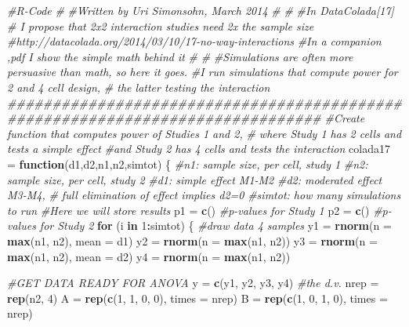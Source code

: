 \documentclass[
]{book}
\newenvironment{Shaded}{\begin{snugshade}}{\end{snugshade}}
\newcommand{\CommentTok}[1]{\textcolor[rgb]{0.56,0.35,0.01}{\textit{#1}}}
\newcommand{\ControlFlowTok}[1]{\textcolor[rgb]{0.13,0.29,0.53}{\textbf{#1}}}
\newcommand{\DataTypeTok}[1]{\textcolor[rgb]{0.13,0.29,0.53}{#1}}
\newcommand{\DecValTok}[1]{\textcolor[rgb]{0.00,0.00,0.81}{#1}}
\newcommand{\KeywordTok}[1]{\textcolor[rgb]{0.13,0.29,0.53}{\textbf{#1}}}
\newcommand{\NormalTok}[1]{#1}
\newcommand{\OperatorTok}[1]{\textcolor[rgb]{0.81,0.36,0.00}{\textbf{#1}}}
\newcommand{\StringTok}[1]{\textcolor[rgb]{0.31,0.60,0.02}{#1}}
\begin{document}
\begin{Shaded}
\begin{Highlighting}[]
\CommentTok{#R-Code}
\CommentTok{#}
\CommentTok{#Written by Uri Simonsohn, March 2014}
\CommentTok{#}
\CommentTok{#}
\CommentTok{#In DataColada[17] }
\CommentTok{# I propose that 2x2 interaction studies need 2x the sample size}
\CommentTok{#http://datacolada.org/2014/03/10/17-no-way-interactions}
\CommentTok{#In a companion ,pdf I show the simple math behind it}
\CommentTok{#}
\CommentTok{#}
\CommentTok{#Simulations are often more persuasive than math, so here it goes.}
\CommentTok{#I run simulations that compute power for 2 and 4 cell design, }
\CommentTok{# the latter testing the interaction}
\CommentTok{###############################################################################}
\CommentTok{#Create function that computes power of Studies 1 and 2, }
\CommentTok{# where Study 1  has 2 cells and tests a simple effect}
\CommentTok{#and Study 2 has 4 cells and tests the interaction}
\NormalTok{colada17 =}\StringTok{ }\ControlFlowTok{function}\NormalTok{(d1,d2,n1,n2,simtot)}
\NormalTok{  \{}
  \CommentTok{#n1: sample size, per cell, study 1}
  \CommentTok{#n2: sample size, per cell, study 2}
  \CommentTok{#d1: simple effect M1-M2}
  \CommentTok{#d2: moderated effect M3-M4, }
  \CommentTok{# full elimination of effect implies d2=0}
  \CommentTok{#simtot: how many simulations to run}
  \CommentTok{#Here we will store results}
\NormalTok{      p1 =}\StringTok{ }\KeywordTok{c}\NormalTok{()    }\CommentTok{#p-values for Study 1}
\NormalTok{      p2 =}\StringTok{ }\KeywordTok{c}\NormalTok{()    }\CommentTok{#p-values for Study 2}
  \ControlFlowTok{for}\NormalTok{ (i }\ControlFlowTok{in} \DecValTok{1}\OperatorTok{:}\NormalTok{simtot) \{}
    \CommentTok{#draw data 4 samples}
\NormalTok{    y1 =}\StringTok{ }\KeywordTok{rnorm}\NormalTok{(}\DataTypeTok{n =} \KeywordTok{max}\NormalTok{(n1, n2), }\DataTypeTok{mean =}\NormalTok{ d1)}
\NormalTok{    y2 =}\StringTok{ }\KeywordTok{rnorm}\NormalTok{(}\DataTypeTok{n =} \KeywordTok{max}\NormalTok{(n1, n2))}
\NormalTok{    y3 =}\StringTok{ }\KeywordTok{rnorm}\NormalTok{(}\DataTypeTok{n =} \KeywordTok{max}\NormalTok{(n1, n2), }\DataTypeTok{mean =}\NormalTok{ d2)}
\NormalTok{    y4 =}\StringTok{ }\KeywordTok{rnorm}\NormalTok{(}\DataTypeTok{n =} \KeywordTok{max}\NormalTok{(n1, n2))}
    
    \CommentTok{#GET DATA READY FOR ANOVA  }
\NormalTok{    y =}\StringTok{ }\KeywordTok{c}\NormalTok{(y1, y2, y3, y4)          }\CommentTok{#the d.v.}
\NormalTok{    nrep =}\StringTok{ }\KeywordTok{rep}\NormalTok{(n2, }\DecValTok{4}\NormalTok{)}
\NormalTok{    A =}\StringTok{ }\KeywordTok{rep}\NormalTok{(}\KeywordTok{c}\NormalTok{(}\DecValTok{1}\NormalTok{, }\DecValTok{1}\NormalTok{, }\DecValTok{0}\NormalTok{, }\DecValTok{0}\NormalTok{), }\DataTypeTok{times =}\NormalTok{ nrep)}
\NormalTok{    B =}\StringTok{ }\KeywordTok{rep}\NormalTok{(}\KeywordTok{c}\NormalTok{(}\DecValTok{1}\NormalTok{, }\DecValTok{0}\NormalTok{, }\DecValTok{1}\NormalTok{, }\DecValTok{0}\NormalTok{), }\DataTypeTok{times =}\NormalTok{ nrep)}
    

\end{Highlighting}
\end{Shaded}
\end{document}
